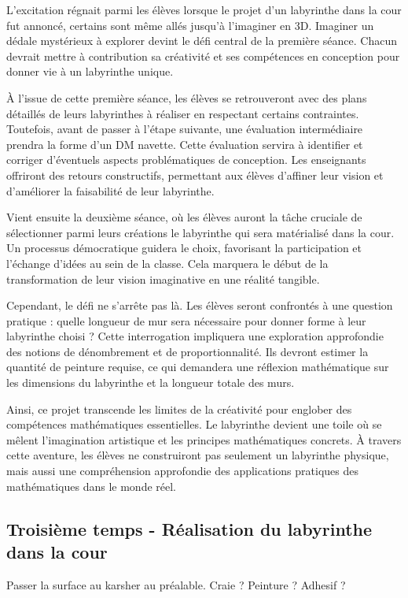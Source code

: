 

L'excitation régnait parmi les élèves lorsque le projet d'un labyrinthe dans la cour fut annoncé, certains sont même allés jusqu'à l'imaginer en 3D.
Imaginer un dédale mystérieux à explorer devint le défi central de la première séance. Chacun devrait mettre à contribution sa créativité
et ses compétences en conception pour donner vie à un labyrinthe unique.

À l'issue de cette première séance, les élèves se retrouveront avec des plans détaillés de leurs labyrinthes à réaliser en respectant certains contraintes.
Toutefois, avant de passer à l'étape suivante, une évaluation intermédiaire prendra la forme d'un DM navette. Cette évaluation servira
à identifier et corriger d'éventuels aspects problématiques de conception. Les enseignants offriront des retours constructifs, permettant
aux élèves d'affiner leur vision et d'améliorer la faisabilité de leur labyrinthe.

Vient ensuite la deuxième séance, où les élèves auront la tâche cruciale de sélectionner parmi leurs créations le labyrinthe qui sera
matérialisé dans la cour. Un processus démocratique guidera le choix, favorisant la participation et l'échange d'idées au sein de la classe.
Cela marquera le début de la transformation de leur vision imaginative en une réalité tangible.

Cependant, le défi ne s'arrête pas là. Les élèves seront confrontés à une question pratique : quelle longueur de mur sera nécessaire pour
donner forme à leur labyrinthe choisi ? Cette interrogation impliquera une exploration approfondie des notions de dénombrement et de proportionnalité.
Ils devront estimer la quantité de peinture requise, ce qui demandera une réflexion mathématique sur les dimensions du labyrinthe et
la longueur totale des murs.

Ainsi, ce projet transcende les limites de la créativité pour englober des compétences mathématiques essentielles. Le labyrinthe devient
une toile où se mêlent l'imagination artistique et les principes mathématiques concrets. À travers cette aventure, les élèves ne
construiront pas seulement un labyrinthe physique, mais aussi une compréhension approfondie des applications pratiques des mathématiques
dans le monde réel.

\subsection{Troisième temps - Réalisation du labyrinthe dans la cour}
Passer la surface au karsher au préalable.
Craie ? Peinture ? Adhesif ? 